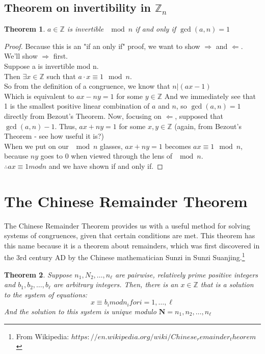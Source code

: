 \documentclass[10pt]{article}
\newcommand{\Z}{\mathbb{Z}}
\newtheorem{theorem}{Theorem}
\theoremstyle{definition}
\theoremstyle{remark}
\def\Z{\mathbb{ Z}}
\def\ra{\Rightarrow}
\def\la{\Leftarrow}
\newcommand{\mb}[1]{\mathbf{#1}}
\begin{document}
\subsection{Theorem on invertibility in $\Z_n$}
\begin{theorem}\label{invertibility}
$a \in \Z$ is invertible $\mod n$ if and only if $\gcd(a,n) = 1$ 
\end{theorem}
\begin{proof}
Because this is an "if an only if" proof, we want to show $\ra$ and $\la$.  We'll show $\ra$ first.\\
Suppose a is invertible mod n.\\
Then $\exists x \in \Z$ such that $a\cdot x \equiv 1 \mod n$.\\
So from the definition of a congruence, we know that $n|(ax-1)$\\
Which is equivalent to $ax - ny = 1$ for some $y\in\Z$
And we immediately see that 1 is the smallest positive linear combination of $a$ and $n$, so $\gcd(a,n) = 1$ directly from Bezout's Theorem.
\newline
Now, focusing on $\la$, supposed that $\gcd(a,n)-1$.  Thus, $ax + ny = 1$ for some $x,y\in\Z$ (again, from Bezout's Theorem - see how useful it is?)\\
When we put on our $\mod n$ glasses, $ax + ny = 1$ becomes $ax \equiv 1 \mod n$, because $ny$ goes to 0 when viewed through the lens of $\mod n$.\\
$\therefore ax \equiv 1 mod n$ and we have shown if and only if.
\end{proof}

\section{The Chinese Remainder Theorem}
The Chinese Remainder Theorem provides us with a useful method for solving systems of congruences, given that certain conditions are met.  This theorem has this name because it is a theorem about remainders, which was first discovered in the 3rd century AD by the Chinese mathematician Sunzi in Sunzi Suanjing.\footnote{From Wikipedia: $https://en.wikipedia.org/wiki/Chinese_remainder_theorem$}
\begin{theorem}\label{Chinese Remainder Theorem}
Suppose $n_1,N_2,\ldots,n_\ell$ are pairwise, relatively prime positive integers and $b_1,b_2,\ldots,b_\ell$ are arbitrary integers.  Then, there is an $x \in \Z$ that is a solution to the system of equations:
$$x \equiv b_i mod n_i  for i = 1,\ldots,\ell$$
And the solution to this system is unique modulo $\mb{N} = n_1,n_2,\ldots,n_\ell$
\end{theorem}
\end{document}
